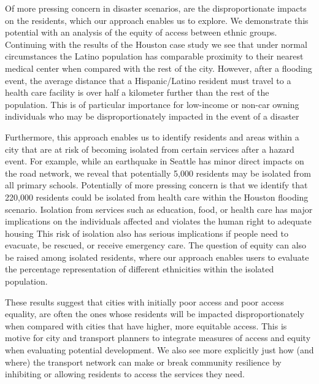 \documentclass[review,3p,times,onecolumn,sort&compress,12pt]{elsarticle}
\let \cite \parencite
\begin{document}
Of more pressing concern in disaster scenarios, are the disproportionate impacts on the residents, which our approach enables us to explore.
We demonstrate this potential with an analysis of the equity of access between ethnic groups.
Continuing with the results of the Houston case study we see that under normal circumstances the Latino population has comparable proximity to their nearest medical center when compared with the rest of the city.
However, after a flooding event, the average distance that a Hispanic/Latino resident must travel to a health care facility is over half a kilometer further than the rest of the population.
This is of particular importance for low-income or non-car owning individuals who may be disproportionately impacted in the event of a disaster \cite{cutter2003social, Frazier2013-wd, Sherrieb2010-lk}

Furthermore, this approach enables us to identify residents and areas within a city that are at risk of becoming isolated from certain services after a hazard event.
For example, while an earthquake in Seattle has minor direct impacts on the road network, we reveal that potentially 5,000 residents may be isolated from all primary schools. 
Potentially of more pressing concern is that we identify that 220,000 residents could be isolated from health care within the Houston flooding scenario.
Isolation from services such as education, food, or health care has major implications on the individuals affected and violates the human right to adequate housing \cite{Cutter2003-xi, Frazier2013-wd}
This risk of isolation also has serious implications if people need to evacuate, be rescued, or receive emergency care. 
The question of equity can also be raised among isolated residents, where our approach enables users to evaluate the percentage representation of different ethnicities within the isolated population.

These results suggest that cities with initially poor access and poor access equality, are often the ones whose residents will be impacted disproportionately when compared with cities that have higher, more equitable access.
This is motive for city and transport planners to integrate measures of access and equity when evaluating potential development.
We also see more explicitly just how (and where) the transport network can make or break community resilience by inhibiting or allowing residents to access the services they need.
\end{document}
